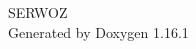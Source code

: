 \documentclass[twoside]{book}
\newcommand{\+}{\discretionary{\mbox{\scriptsize$\hookleftarrow$}}{}{}}
\newcommand{\clearemptydoublepage}{%
    \newpage{\pagestyle{empty}\cleardoublepage}%
  }
\begin{document}
  \raggedbottom
  \begin{titlepage}
  \vspace*{7cm}
  \begin{center}%
  {\Large SERWOZ}\\
  \vspace*{1cm}
  {\large Generated by Doxygen 1.16.1}\\
  \end{center}
  \end{titlepage}
  \clearemptydoublepage
  \tableofcontents
  \clearemptydoublepage
  \backmatter
  \newpage
  \clearemptydoublepage
  \printindex
\end{document}
